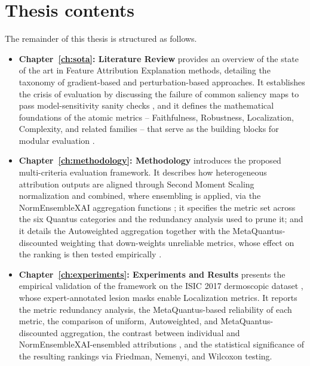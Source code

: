 
\section{Thesis contents}

The remainder of this thesis is structured as follows.

\begin{itemize}
    \item \textbf{Chapter~\ref{ch:sota}: Literature Review} provides an
    overview of the state of the art in Feature Attribution Explanation methods,
    detailing the taxonomy of gradient-based \cite{selvaraju2017grad} and
    perturbation-based \cite{ribeiro2016why} approaches. It establishes the
    crisis of evaluation \cite{hedstrom2023quantus} by discussing the failure of
    common saliency maps to pass model-sensitivity sanity checks
    \cite{adebayo2018sanity}, and it defines the mathematical foundations of the
    atomic metrics -- Faithfulness, Robustness, Localization, Complexity, and
    related families -- that serve as the building blocks for modular evaluation
    \cite{hedstrom2023quantus, alvarez2018robustness}.

    \item \textbf{Chapter~\ref{ch:methodology}: Methodology} introduces the
    proposed multi-criteria evaluation framework. It describes how heterogeneous
    attribution outputs are aligned through Second Moment Scaling normalization
    and combined, where ensembling is applied, via the NormEnsembleXAI
    aggregation functions \cite{hryniewska2024normensemblexai}; it specifies the
    metric set across the six Quantus categories and the redundancy analysis used
    to prune it; and it details the Autoweighted aggregation together with the
    MetaQuantus-discounted weighting that down-weights unreliable metrics, whose
    effect on the ranking is then tested empirically
    \cite{hedstrom2024metaquantus, hryniewska2024normensemblexai}.

    \item \textbf{Chapter~\ref{ch:experiments}: Experiments and Results}
    presents the empirical validation of the framework on the ISIC 2017
    dermoscopic dataset \cite{codella2018isic}, whose expert-annotated
    lesion masks enable Localization metrics. It reports the metric redundancy
    analysis, the MetaQuantus-based reliability of each metric, the comparison of
    uniform, Autoweighted, and MetaQuantus-discounted aggregation, the contrast
    between individual and NormEnsembleXAI-ensembled attributions
    \cite{hryniewska2024normensemblexai}, and the statistical significance of the
    resulting rankings via Friedman, Nemenyi, and Wilcoxon testing.


\end{itemize}

